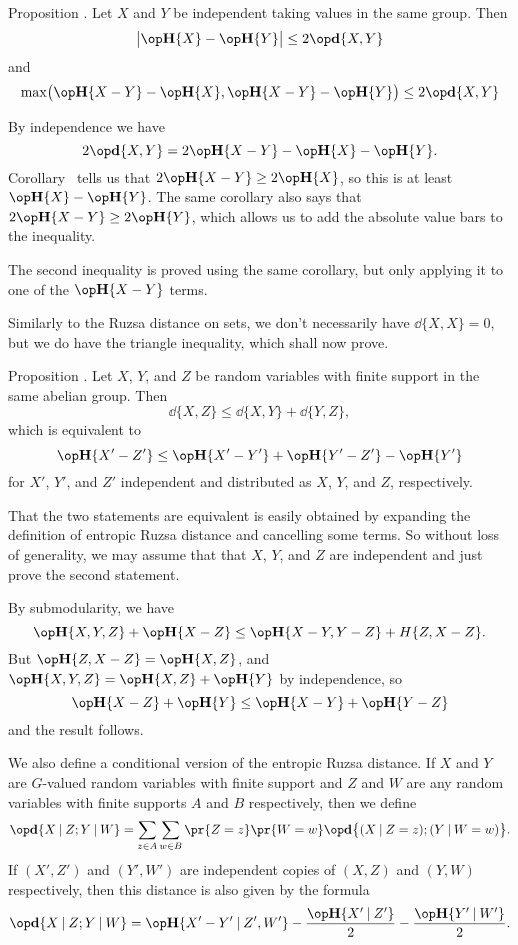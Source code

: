 \edef\propabsdist{\the\sectcount.\the\thmcount}
\proclaim Proposition \advthm. Let $X$ and $Y$ be independent taking values in the same group. Then
$$\bigl| \Eta\{X\} - \Eta\{Y\} \bigr| \le 2\dd\{X,Y\}$$
and
$$\max\bigl( \Eta\{X-Y\} - \Eta\{X\}, \Eta\{X-Y\} - \Eta\{Y\} \bigr) \le 2\dd\{X,Y\}$$

\proof By independence we have
$$2\dd\{X,Y\} = 2\Eta\{X-Y\} - \Eta\{X\} - \Eta\{Y\}.$$
Corollary~{\cormaxsumineq} tells us that $2\Eta\{X-Y\} \ge 2\Eta\{X\}$, so this is at least $\Eta\{X\}-\Eta\{Y\}$.
The same corollary also says that $2\Eta\{X-Y\} \ge 2\Eta\{Y\}$, which allows us to add the absolute value bars
to the inequality.

The second inequality is proved using the same corollary, but only applying it to one of the $\Eta\{X-Y\}$
terms.\slug

Similarly to the Ruzsa distance on sets, we don't necessarily have $\dd\{X,X\} = 0$, but we do have
the triangle inequality, which shall now prove.

\proclaim Proposition \advthm. Let $X$, $Y$, and $Z$ be random variables with finite support in the same
abelian group. Then
$$\dd\{X,Z\} \le \dd\{X,Y\} + \dd\{Y,Z\},$$
which is equivalent to
$$\Eta\{X'-Z'\} \le \Eta\{X'-Y'\} + \Eta\{Y'-Z'\} - \Eta\{Y'\}$$
for $X'$, $Y'$, and $Z'$ independent and distributed as $X$, $Y$, and $Z$, respectively.

\proof That the two statements are equivalent is easily obtained by expanding the definition of
entropic Ruzsa distance and cancelling some terms. So without loss of generality, we may assume that
that $X$, $Y$, and $Z$ are independent and just prove the second statement.

By submodularity, we have
$$\Eta\{X,Y,Z\} + \Eta\{X-Z\} \le \Eta\{X-Y, Y-Z\} + H\{Z, X-Z\}.$$
But $\Eta\{Z, X-Z\} = \Eta\{X,Z\}$, and
$\Eta\{X,Y,Z\} = \Eta\{X,Z\} + \Eta\{Y\}$ by independence, so
$$ \Eta\{X-Z\} + \Eta\{Y\} \le \Eta\{X-Y\} + \Eta\{Y-Z\}$$
and the result follows.\slug

We also define a conditional version of the entropic Ruzsa distance. If $X$ and $Y$ are $G$-valued
random variables with finite support and $Z$ and $W$ are any random variables with finite supports
$A$ and $B$ respectively, then we define
$$\dd\{ X\given Z ; Y\given W\} = \sum_{z\in A} \sum_{w\in B} \pr\{Z = z\} \pr\{W=w\}
\dd\bigl\{ (X\given Z = z) ; (Y\given W=w)\bigr\}.$$
If $(X',Z')$ and $(Y',W')$ are independent copies of $(X,Z)$ and $(Y,W)$ respectively, then this
distance is also given by the formula
$$\dd\{ X\given Z ; Y\given W\} = \Eta\{X'-Y'\given Z',W'\} - {\Eta\{X'\given Z'\}\over 2}
- {\Eta\{Y'\given W'\}\over 2}.$$

